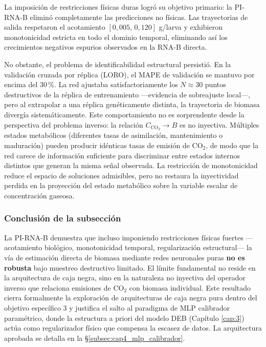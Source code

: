 La imposición de restricciones físicas duras logró su objetivo primario: la PI-RNA-B eliminó completamente las predicciones no físicas. Las trayectorias de salida respetaron el acotamiento $[0{,}005,\,0{,}120]$ g/larva y exhibieron monotonicidad estricta en todo el dominio temporal, eliminando así los crecimientos negativos espurios observados en la RNA-B directa.

No obstante, el problema de identificabilidad estructural persistió. En la validación cruzada por réplica (LORO), el MAPE de validación se mantuvo por encima del $30\,$\%. La red ajustaba satisfactoriamente los $N\approx 30$ puntos destructivos de la réplica de entrenamiento —evidencia de sobreajuste local—, pero al extrapolar a una réplica genéticamente distinta, la trayectoria de biomasa divergía sistemáticamente. Este comportamiento no es sorprendente desde la perspectiva del problema inverso: la relación $C_{\mathrm{CO}_2}\rightarrow B$ es no inyectiva. Múltiples estados metabólicos (diferentes tasas de asimilación, mantenimiento o maduración) pueden producir idénticas tasas de emisión de CO$_2$, de modo que la red carece de información suficiente para discriminar entre estados internos distintos que generan la misma señal observada. La restricción de monotonicidad reduce el espacio de soluciones admisibles, pero no restaura la inyectividad perdida en la proyección del estado metabólico sobre la variable escalar de concentración gaseosa.

\subsubsection*{Conclusión de la subsección}

La PI-RNA-B demuestra que incluso imponiendo restricciones físicas fuertes —acotamiento biológico, monotonicidad temporal, regularización estructural— la vía de estimación directa de biomasa mediante redes neuronales puras \textbf{no es robusta} bajo muestreo destructivo limitado. El límite fundamental no reside en la arquitectura de caja negra, sino en la naturaleza no inyectiva del operador inverso que relaciona emisiones de CO$_2$ con biomasa individual. Este resultado cierra formalmente la exploración de arquitecturas de caja negra pura dentro del objetivo específico 3 y justifica el salto al paradigma de MLP calibrador paramétrico, donde la estructura a priori del modelo DEB (Capítulo \ref{cap:3}) actúa como regularizador físico que compensa la escasez de datos. La arquitectura aprobada se detalla en la \S\ref{subsec:cap4_mlp_calibrador}.

